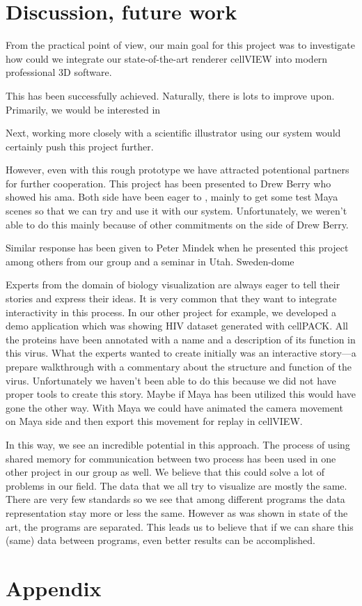 \documentclass[
  digital, %
  table,   %
  nolof,     %
  nolot,     %
]{fithesis3}
\begin{document}

\chapter{Discussion, future work}
From the practical point of view, our main goal for this project was to investigate how could we integrate our state-of-the-art renderer cellVIEW into modern professional 3D software.

This has been successfully achieved. Naturally, there is lots to improve upon. Primarily, we would be interested in

Next, working more closely with a scientific illustrator using our system would certainly push this project further.

However, even with this rough prototype we have attracted potentional partners for further cooperation. This project has been presented to Drew Berry who showed his ama. Both side have been eager to , mainly to get some test Maya scenes so that we can try and use it with our system. Unfortunately, we weren't able to do this mainly because of other commitments on the side of Drew Berry.

Similar response has been given to Peter Mindek when he presented this project among others from our group and a seminar in Utah. Sweden-dome

Experts from the domain of biology visualization are always eager to tell their stories and express their ideas. It is very common that they want to integrate interactivity in this process. In our other project for example, we developed a demo application which was showing HIV dataset generated with cellPACK. All the proteins have been annotated with a name and a description of its function in this virus. What the experts wanted to create initially was an interactive story—a prepare walkthrough with a commentary about the structure and function of the virus. Unfortunately we haven't been able to do this because we did not have proper tools to create this story. Maybe if Maya has been utilized this would have gone the other way. With Maya we could have animated the camera movement on Maya side and then export this movement for replay in cellVIEW.

In this way, we see an incredible potential in this approach. The process of using shared memory for communication between two process has been used in one other project in our group as well. We believe that this could solve a lot of problems in our field. The data that we all try to visualize are mostly the same. There are very few standards so we see that among different programs the data representation stay more or less the same. However as was shown in state of the art, the programs are separated. This leads us to believe that if we can share this (same) data between programs, even better results can be accomplished.

\newpage
\printbibliography[heading=bibintoc]

\appendix %
\chapter{Appendix}
\end{document}
